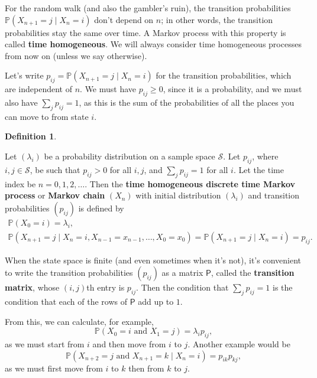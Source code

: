 \documentclass[
  a4paper,
]{article}
\theoremstyle{definition}
\newtheorem{definition}{Definition}[section]
\theoremstyle{definition}
\theoremstyle{definition}
\theoremstyle{remark}
\begin{document}
For the random walk (and also the gambler's ruin), the transition probabilities \(\mathbb P(X_{n+1} = j \mid X_n = i)\) don't depend on \(n\); in other words, the transition probabilities stay the same over time. A Markov process with this property is called \textbf{time homogeneous}. We will always consider time homogeneous processes from now on (unless we say otherwise).

Let's write \(p_{ij} = \mathbb P(X_{n+1} = j \mid X_n = i)\) for the transition probabilities, which are independent of \(n\).
We must have \(p_{ij} \geq 0\), since it is a probability, and we must also have \(\sum_j p_{ij} = 1\), as this is the sum of the probabilities of all the places you can move to from state \(i\).

\begin{definition}
\protect\hypertarget{def:def-thmc}{}\label{def:def-thmc}

Let \((\lambda_i)\) be a probability distribution on a sample space \(\mathcal S\). Let \(p_{ij}\), where \(i,j \in \mathcal S\), be such that \(p_{ij} > 0\) for all \(i,j\), and \(\sum_j p_{ij} = 1\) for all \(i\). Let the time index be \(n = 0,1,2,\dots\). Then the \textbf{time homogeneous discrete time Markov process} or \textbf{Markov chain} \((X_n)\) with initial distribution \((\lambda_i)\) and transition probabilities \((p_{ij})\) is defined by
\begin{gather*}
    \mathbb P(X_0 = i) = \lambda_i ,\\
    \mathbb P(X_{n+1} = j \mid X_n = i, X_{n-1} = x_{n-1}, \dots, X_0 = x_0) = \mathbb P(X_{n+1} = j \mid X_n = i) =  p_{ij}  . \end{gather*}

\end{definition}

When the state space is finite (and even sometimes when it's not), it's convenient to write the transition probabilities \((p_{ij})\) as a matrix \(\mathsf P\), called the \textbf{transition matrix}, whose \((i,j)\)th entry is \(p_{ij}\). Then the condition that \(\sum_j p_{ij} = 1\) is the condition that each of the rows of \(\mathsf P\) add up to \(1\).

From this, we can calculate, for example,
\[ \mathbb P(X_0 = i \text{ and } X_1 = j) = \lambda_i p_{ij} , \]
as we must start from \(i\) and then move from \(i\) to \(j\). Another example would be
\[ \mathbb P(X_{n+2} = j \text{ and } X_{n+1} = k \mid X_n = i) = p_{ik}p_{kj} , \]
as we must first move from \(i\) to \(k\) then from \(k\) to \(j\).
\end{document}
